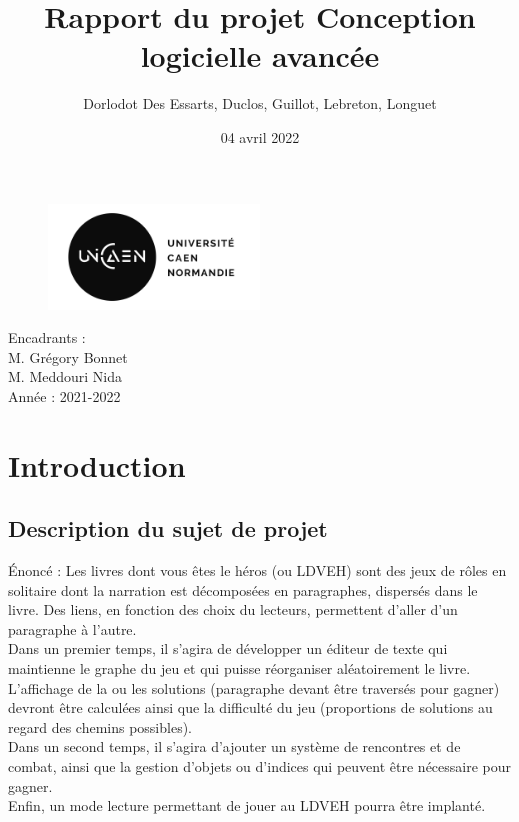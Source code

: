 \documentclass[12pt]{article}
\begin{document}
\begin{titlepage}

\title{Rapport du projet Conception logicielle avancée}
\author{Dorlodot Des Essarts, Duclos, Guillot, Lebreton, Longuet}
\date{04 avril 2022}
\maketitle
\begin{figure}[htp]
  
  \centering
    \includegraphics[width=0.5\textwidth]{Logo_unicaen}
\end{figure}
\vfill
\vfill
\begin{flushleft}
Encadrants :\\
M. Grégory Bonnet\\
M. Meddouri Nida\\
\bigskip
Année : 2021-2022\\
\end{flushleft}

\hfill
\thispagestyle{empty}
\setcounter{page}{0}
\end{titlepage}




\newpage

\tableofcontents

\newpage
	
\section{Introduction}
\subsection{Description du sujet de projet}
Énoncé : Les livres dont vous êtes le héros (ou LDVEH) sont des jeux de rôles en solitaire dont la
narration est décomposées en paragraphes, dispersés dans le livre. Des liens, en fonction des choix
du lecteurs, permettent d’aller d’un paragraphe à l’autre.\medskip
\\
Dans un premier temps, il s’agira de développer un éditeur de texte qui maintienne le graphe du jeu 
et qui puisse réorganiser aléatoirement le livre. L’affichage de la ou les solutions (paragraphe devant être traversés pour
gagner) devront être calculées ainsi que la difficulté du jeu (proportions de solutions au regard des
chemins possibles).\medskip
\\
Dans un second temps, il s’agira d’ajouter un système de rencontres et de combat, ainsi que la gestion d’objets ou d’indices qui peuvent être nécessaire pour gagner. \medskip
\\
Enfin, un mode lecture permettant de jouer au LDVEH pourra être implanté.
\end{document}
